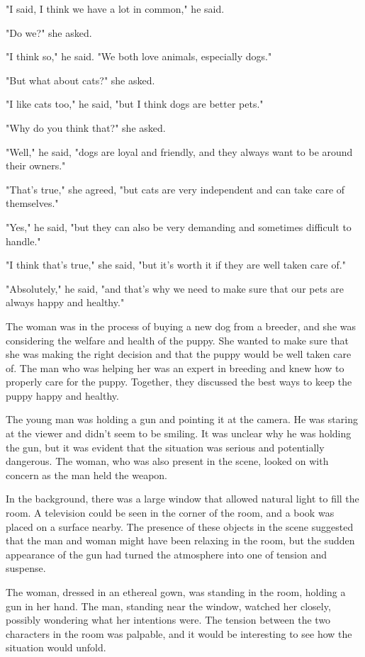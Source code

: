 \documentclass[smalldemyvopaper,11pt,twoside,onecolumn,openright,extrafontsizes]{memoir}
\begin{document}
"I said, I think we have a lot in common," he said.\par
"Do we?" she asked.\par
"I think so," he said. "We both love animals, especially dogs."\par
"But what about cats?" she asked.\par
"I like cats too," he said, "but I think dogs are better pets."\par
"Why do you think that?" she asked.\par
"Well," he said, "dogs are loyal and friendly, and they always want to be around their owners."\par
"That's true," she agreed, "but cats are very independent and can take care of themselves."\par
"Yes," he said, "but they can also be very demanding and sometimes difficult to handle."\par
"I think that's true," she said, "but it's worth it if they are well taken care of."\par
"Absolutely," he said, "and that's why we need to make sure that our pets are always happy and healthy."\par
The woman was in the process of buying a new dog from a breeder, and she was considering the welfare and health of the puppy. She wanted to make sure that she was making the right decision and that the puppy would be well taken care of. The man who was helping her was an expert in breeding and knew how to properly care for the puppy. Together, they discussed the best ways to keep the puppy happy and healthy.\par
The young man was holding a gun and pointing it at the camera. He was staring at the viewer and didn't seem to be smiling. It was unclear why he was holding the gun, but it was evident that the situation was serious and potentially dangerous. The woman, who was also present in the scene, looked on with concern as the man held the weapon.\par
In the background, there was a large window that allowed natural light to fill the room. A television could be seen in the corner of the room, and a book was placed on a surface nearby. The presence of these objects in the scene suggested that the man and woman might have been relaxing in the room, but the sudden appearance of the gun had turned the atmosphere into one of tension and suspense.\par
The woman, dressed in an ethereal gown, was standing in the room, holding a gun in her hand. The man, standing near the window, watched her closely, possibly wondering what her intentions were. The tension between the two characters in the room was palpable, and it would be interesting to see how the situation would unfold.\par
\end{document}
